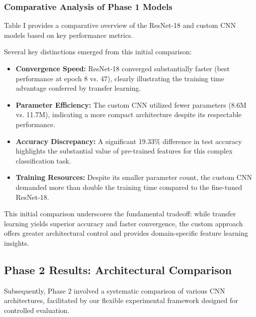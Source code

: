 
\subsubsection{Comparative Analysis of Phase 1 Models}
Table I provides a comparative overview of the ResNet-18 and custom CNN models based on key performance metrics.


Several key distinctions emerged from this initial comparison:
\begin{itemize}
    \item \textbf{Convergence Speed:} ResNet-18 converged substantially faster (best performance at epoch 8 vs. 47), clearly illustrating the training time advantage conferred by transfer learning.
    \item \textbf{Parameter Efficiency:} The custom CNN utilized fewer parameters (8.6M vs. 11.7M), indicating a more compact architecture despite its respectable performance.
    \item \textbf{Accuracy Discrepancy:} A significant 19.33\% difference in test accuracy highlights the substantial value of pre-trained features for this complex classification task.
    \item \textbf{Training Resources:} Despite its smaller parameter count, the custom CNN demanded more than double the training time compared to the fine-tuned ResNet-18.
\end{itemize}
This initial comparison underscores the fundamental tradeoff: while transfer learning yields superior accuracy and faster convergence, the custom approach offers greater architectural control and provides domain-specific feature learning insights.

\subsection{Phase 2 Results: Architectural Comparison}
Subsequently, Phase 2 involved a systematic comparison of various CNN architectures, facilitated by our flexible experimental framework designed for controlled evaluation.

